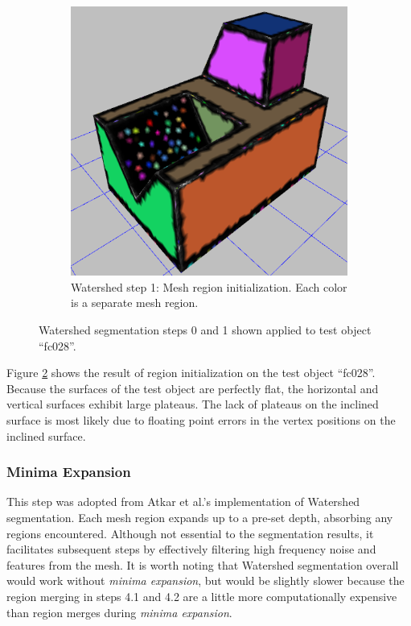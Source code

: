 \begin{figure}[htb]
\begin{subfigure}{0.45\textwidth}
		\includegraphics[width=\linewidth]{../resources/watershed/fc028_WS1.png}
		\caption{Watershed step 1: Mesh region initialization. Each color is a separate mesh region.}
		\label{sfig:ws_1}
	\end{subfigure}
\caption{
Watershed segmentation steps 0 and 1 shown applied to test object ``fc028''.
}
\end{figure}

Figure \ref{sfig:ws_1} shows the result of region initialization on the test object ``fc028''.
Because the surfaces of the test object are perfectly flat, the horizontal and vertical surfaces exhibit large plateaus.
The lack of plateaus on the inclined surface is most likely due to floating point errors in the vertex positions on the inclined surface.

\subsubsection{Minima Expansion}
This step was adopted from Atkar et al.'s implementation of Watershed segmentation\cite{HierSurfSeg_for_autobody_painting}.
Each mesh region expands up to a pre-set depth, absorbing any regions encountered.
Although not essential to the segmentation results, it facilitates subsequent steps by effectively filtering high frequency noise and features from the mesh.
It is worth noting that Watershed segmentation overall would work without \textit{minima expansion}, but would be slightly slower because the region merging in steps 4.1 and 4.2 are a little more computationally expensive than region merges during \textit{minima expansion}.

